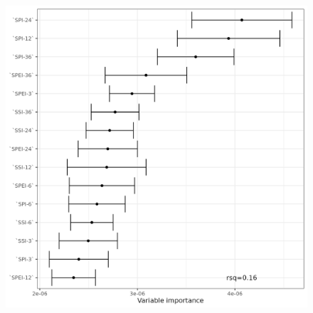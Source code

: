 \documentclass[
  authoryear,
  preprint,
  3p,
  onecolumn]{elsarticle}
\begin{document}
\begin{figure}[!ht]
\begin{minipage}{0.33\linewidth}
{\includegraphics[width=1\textwidth,height=\textheight]{../output/figs/fig_errorbar_resample_random_forest_trends_Cropland.png}

}


\end{minipage}%
%
\begin{minipage}{0.33\linewidth}

\end{minipage}
\end{figure}
\end{document}
